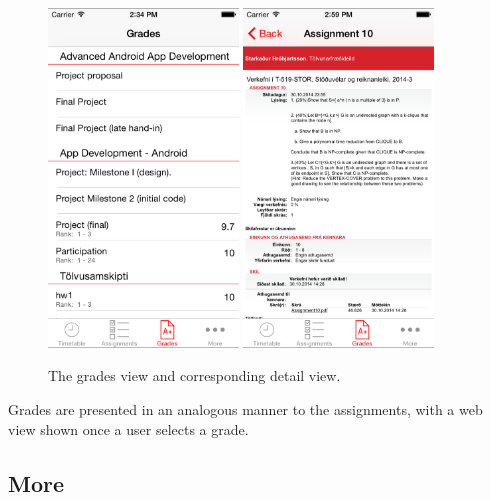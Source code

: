 \documentclass[pdftex, DIV=calc, paper=a4, fontsize=11pt]{scrartcl}	 %
\begin{document}
\begin{figure}[t]
    \centering
    \includegraphics[width=0.45\textwidth]{grades.png}
    \hspace{0.2in}
    \includegraphics[width=0.45\textwidth]{grades-detail.png}
    \caption{The grades view and corresponding detail view.}
    \label{fig:grades}
\end{figure}

Grades are presented in an analogous manner to the assignments, with a web view shown once a 
user selects a grade. 

\subsection{More}
\end{document}
